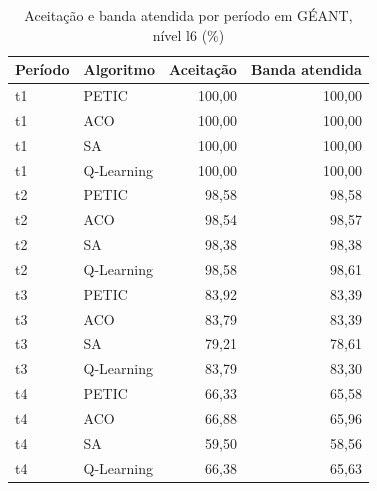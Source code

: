 \begin{table}[htb]
    \centering
    \scriptsize
    \caption{Aceitação e banda atendida por período em GÉANT, nível l6 (\%)}
    \label{tab:periodos-geant-l6}
    \begin{tabular}{llrr}
        \hline
        Período & Algoritmo & Aceitação & Banda atendida \\
        \hline
        t1 & PETIC & 100,00 & 100,00 \\
        t1 & ACO & 100,00 & 100,00 \\
        t1 & SA & 100,00 & 100,00 \\
        t1 & Q-Learning & 100,00 & 100,00 \\
        t2 & PETIC & 98,58 & 98,58 \\
        t2 & ACO & 98,54 & 98,57 \\
        t2 & SA & 98,38 & 98,38 \\
        t2 & Q-Learning & 98,58 & 98,61 \\
        t3 & PETIC & 83,92 & 83,39 \\
        t3 & ACO & 83,79 & 83,39 \\
        t3 & SA & 79,21 & 78,61 \\
        t3 & Q-Learning & 83,79 & 83,30 \\
        t4 & PETIC & 66,33 & 65,58 \\
        t4 & ACO & 66,88 & 65,96 \\
        t4 & SA & 59,50 & 58,56 \\
        t4 & Q-Learning & 66,38 & 65,63 \\
        \hline
    \end{tabular}
\end{table}
